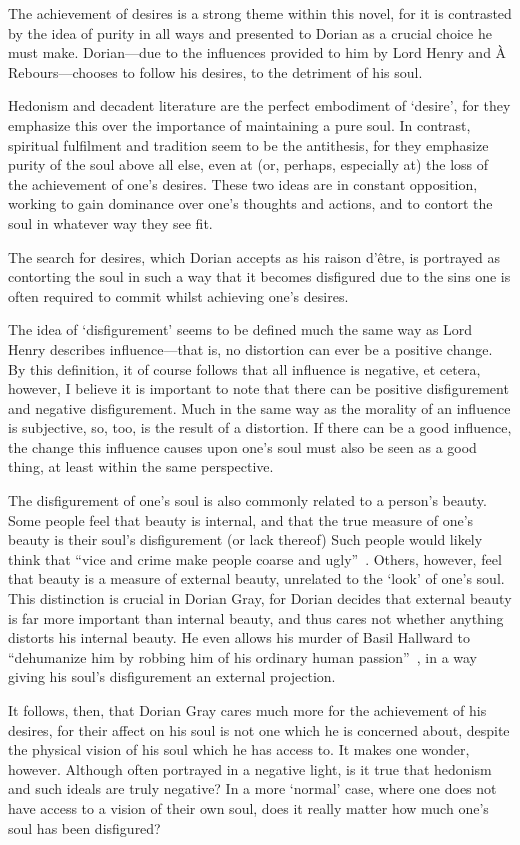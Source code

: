 \documentclass[12pt]{article}
\begin{document}
The achievement of desires is a strong theme within this novel, for it is contrasted by the idea of purity in all ways and presented to Dorian as a crucial choice he must make. Dorian—due to the influences provided to him by Lord Henry and À Rebours—chooses to follow his desires, to the detriment of his soul.

Hedonism and decadent literature are the perfect embodiment of `desire', for they emphasize this over the importance of maintaining a pure soul. In contrast, spiritual fulfilment and tradition seem to be the antithesis, for they emphasize purity of the soul above all else, even at (or, perhaps, especially at) the loss of the achievement of one's desires. These two ideas are in constant opposition, working to gain dominance over one's thoughts and actions, and to contort the soul in whatever way they see fit.

The search for desires, which Dorian accepts as his raison d'être, is portrayed as contorting the soul in such a way that it becomes disfigured due to the sins one is often required to commit whilst achieving one's desires.

The idea of `disfigurement' seems to be defined much the same way as Lord Henry describes influence—that is, no distortion can ever be a positive change. By this definition, it of course follows that all influence is negative, et cetera, however, I believe it is important to note that there can be positive disfigurement and negative disfigurement. Much in the same way as the morality of an influence is subjective, so, too, is the result of a distortion. If there can be a good influence, the change this influence causes upon one's soul must also be seen as a good thing, at least within the same perspective.

The disfigurement of one's soul is also commonly related to a person's beauty. Some people feel that beauty is internal, and that the true measure of one's beauty is their soul's disfigurement (or lack thereof) Such people would likely think that ``vice and crime make people coarse and ugly''~\cite[116]{pater}. Others, however, feel that beauty is a measure of external beauty, unrelated to the `look' of one's soul. This distinction is crucial in Dorian Gray, for Dorian decides that external beauty is far more important than internal beauty, and thus cares not whether anything distorts his internal beauty. He even allows his murder of Basil Hallward to ``dehumanize him by robbing him of his ordinary human passion''~\cite[86]{riquelme}, in a way giving his soul's disfigurement an external projection.

It follows, then, that Dorian Gray cares much more for the achievement of his desires, for their affect on his soul is not one which he is concerned about, despite the physical vision of his soul which he has access to. It makes one wonder, however. Although often portrayed in a negative light, is it true that hedonism and such ideals are truly negative? In a more `normal' case, where one does not have access to a vision of their own soul, does it really matter how much one's soul has been disfigured?
\newpage


\end{document}
